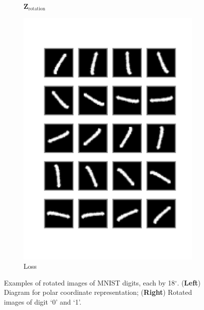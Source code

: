 \documentclass[../../book-main.tex]{subfiles}
\begin{document}
\begin{example}
\begin{figure}[t]
\begin{subfigure}[t]{0.3\textwidth}
        \caption{$\bm{Z}_{\text{rotation}}$}
    \end{subfigure}
    \hfill
    \begin{subfigure}[t]{0.3\textwidth}
        \centering
        \includegraphics[width=\textwidth]{figs_chap4/mnist1d_img1.pdf}
        \caption{Loss}
    \end{subfigure}
    \caption{\small Examples of rotated images of MNIST digits, each by 18$^{\circ}$. (\textbf{Left}) Diagram for polar coordinate representation;  (\textbf{Right}) Rotated images of digit `0' and `1'.}
    \label{fig:samples-invariant-1d-mnist-diagram}
\end{figure}



\end{example}
\end{document}
